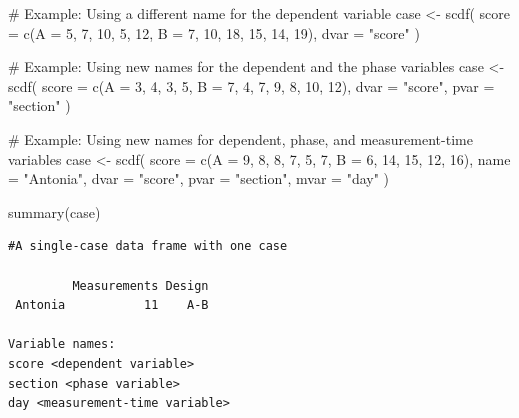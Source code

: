 \documentclass[
  letterpaper,
  DIV=11,
  numbers=noendperiod]{scrreprt}
\newenvironment{Shaded}{\begin{snugshade}}{\end{snugshade}}
\newcommand{\AttributeTok}[1]{\textcolor[rgb]{0.40,0.45,0.13}{#1}}
\newcommand{\CommentTok}[1]{\textcolor[rgb]{0.37,0.37,0.37}{#1}}
\newcommand{\DecValTok}[1]{\textcolor[rgb]{0.68,0.00,0.00}{#1}}
\newcommand{\FunctionTok}[1]{\textcolor[rgb]{0.28,0.35,0.67}{#1}}
\newcommand{\NormalTok}[1]{\textcolor[rgb]{0.00,0.23,0.31}{#1}}
\newcommand{\OtherTok}[1]{\textcolor[rgb]{0.00,0.23,0.31}{#1}}
\newcommand{\StringTok}[1]{\textcolor[rgb]{0.13,0.47,0.30}{#1}}
\begin{document}
\begin{Shaded}
\begin{Highlighting}[]
\CommentTok{\# Example: Using a different name for the dependent variable}
\NormalTok{case }\OtherTok{\textless{}{-}} \FunctionTok{scdf}\NormalTok{(}
  \AttributeTok{score =} \FunctionTok{c}\NormalTok{(}\AttributeTok{A =} \DecValTok{5}\NormalTok{, }\DecValTok{7}\NormalTok{, }\DecValTok{10}\NormalTok{, }\DecValTok{5}\NormalTok{, }\DecValTok{12}\NormalTok{, }\AttributeTok{B =} \DecValTok{7}\NormalTok{, }\DecValTok{10}\NormalTok{, }\DecValTok{18}\NormalTok{, }\DecValTok{15}\NormalTok{, }\DecValTok{14}\NormalTok{, }\DecValTok{19}\NormalTok{), }
  \AttributeTok{dvar =} \StringTok{"score"}
\NormalTok{)}

\CommentTok{\# Example: Using new names for the dependent and the phase variables}
\NormalTok{case }\OtherTok{\textless{}{-}} \FunctionTok{scdf}\NormalTok{(}
  \AttributeTok{score =} \FunctionTok{c}\NormalTok{(}\AttributeTok{A =} \DecValTok{3}\NormalTok{, }\DecValTok{4}\NormalTok{, }\DecValTok{3}\NormalTok{, }\DecValTok{5}\NormalTok{, }\AttributeTok{B =} \DecValTok{7}\NormalTok{, }\DecValTok{4}\NormalTok{, }\DecValTok{7}\NormalTok{, }\DecValTok{9}\NormalTok{, }\DecValTok{8}\NormalTok{, }\DecValTok{10}\NormalTok{, }\DecValTok{12}\NormalTok{), }
  \AttributeTok{dvar =} \StringTok{"score"}\NormalTok{, }\AttributeTok{pvar =} \StringTok{"section"}
\NormalTok{)}

\CommentTok{\# Example: Using new names for dependent, phase, and measurement{-}time variables}
\NormalTok{case }\OtherTok{\textless{}{-}} \FunctionTok{scdf}\NormalTok{(}
  \AttributeTok{score =} \FunctionTok{c}\NormalTok{(}\AttributeTok{A =} \DecValTok{9}\NormalTok{, }\DecValTok{8}\NormalTok{, }\DecValTok{8}\NormalTok{, }\DecValTok{7}\NormalTok{, }\DecValTok{5}\NormalTok{, }\DecValTok{7}\NormalTok{, }\AttributeTok{B =} \DecValTok{6}\NormalTok{, }\DecValTok{14}\NormalTok{, }\DecValTok{15}\NormalTok{, }\DecValTok{12}\NormalTok{, }\DecValTok{16}\NormalTok{), }
  \AttributeTok{name =} \StringTok{"Antonia"}\NormalTok{, }\AttributeTok{dvar =} \StringTok{"score"}\NormalTok{, }\AttributeTok{pvar =} \StringTok{"section"}\NormalTok{, }\AttributeTok{mvar =} \StringTok{"day"}
\NormalTok{)}

\FunctionTok{summary}\NormalTok{(case)}
\end{Highlighting}
\end{Shaded}

\begin{verbatim}
#A single-case data frame with one case

         Measurements Design
 Antonia           11    A-B

Variable names:
score <dependent variable>
section <phase variable>
day <measurement-time variable>
\end{verbatim}
\end{document}
